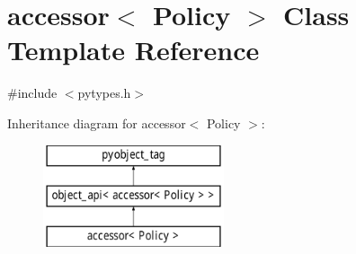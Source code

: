 \hypertarget{classaccessor}{}\section{accessor$<$ Policy $>$ Class Template Reference}
\label{classaccessor}


{\ttfamily \#include $<$pytypes.\+h$>$}

Inheritance diagram for accessor$<$ Policy $>$\+:\begin{figure}[H]
\begin{center}
\leavevmode
\includegraphics[height=3.000000cm]{classaccessor}
\end{center}
\end{figure}

